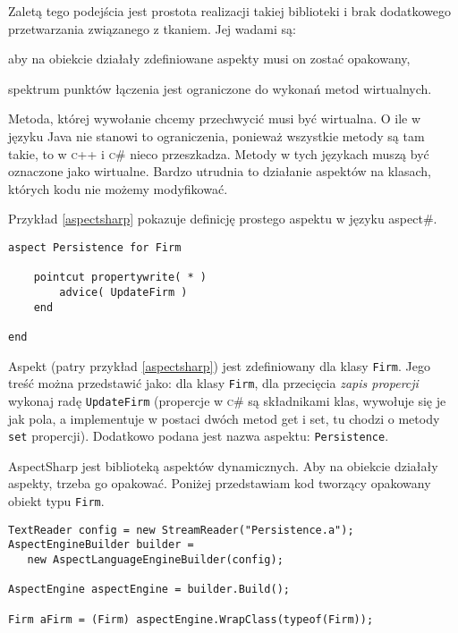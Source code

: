 \documentclass[a4paper,12pt]{mwbk}
\begin{document}
Zaletą tego podejścia jest prostota realizacji takiej biblioteki i brak
dodatkowego przetwarzania związanego z tkaniem. Jej wadami są:
 
\begin{itemize*}

    \item  aby na obiekcie działały zdefiniowane aspekty
         musi on zostać opakowany,
    \item spektrum punktów łączenia jest ograniczone do wykonań metod wirtualnych.
\end{itemize*}
 
Metoda, której wywołanie chcemy przechwycić musi być wirtualna.  O ile w języku
Java nie stanowi to ograniczenia, ponieważ wszystkie metody są tam takie, to w
\textsc{c++} i \textsc{c\#} nieco przeszkadza. Metody w tych językach muszą być
oznaczone jako wirtualne. Bardzo utrudnia to działanie aspektów na klasach,
których kodu nie możemy modyfikować.
 
 Przykład \ref{aspectsharp} pokazuje definicję prostego aspektu w języku aspect\#.
         
\begin{lstlisting}[style=AspectJ, caption=Aspekt w języku aspect\#,label=aspectsharp]
aspect Persistence for Firm

    pointcut propertywrite( * )
        advice( UpdateFirm )
    end

end
\end{lstlisting}
	
Aspekt (patry przykład \ref{aspectsharp}) jest zdefiniowany dla klasy
\lstinline^Firm^. Jego treść można przedstawić jako: dla klasy
\lstinline^Firm^, dla przecięcia \emph{zapis propercji} wykonaj radę
\lstinline^UpdateFirm^ (propercje w \textsc{c\#} są składnikami klas, wywołuje
się je jak pola, a implementuje w postaci dwóch metod get i set, tu chodzi o
metody \lstinline!set! propercji).  Dodatkowo podana jest nazwa aspektu:
\lstinline^Persistence^.

AspectSharp jest biblioteką aspektów dynamicznych. Aby na obiekcie działały
aspekty, trzeba go opakować. Poniżej przedstawiam kod tworzący opakowany obiekt
typu \lstinline^Firm^.

		 \begin{lstlisting}[style=AspectJ]
TextReader config = new StreamReader("Persistence.a");
AspectEngineBuilder builder = 
   new AspectLanguageEngineBuilder(config);

AspectEngine aspectEngine = builder.Build();
          
Firm aFirm = (Firm) aspectEngine.WrapClass(typeof(Firm));
\end{lstlisting}
	
\end{document}
